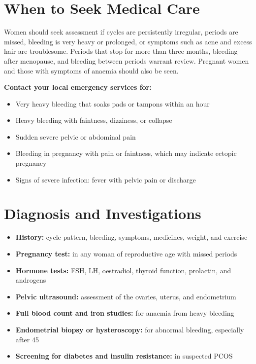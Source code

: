 \section*{When to Seek Medical Care}
Women should seek assessment if cycles are persistently irregular, periods are missed, bleeding is very heavy or prolonged, or symptoms such as acne and excess hair are troublesome. Periods that stop for more than three months, bleeding after menopause, and bleeding between periods warrant review. Pregnant women and those with symptoms of anaemia should also be seen.

\textbf{Contact your local emergency services for:}
\begin{itemize}
    \item Very heavy bleeding that soaks pads or tampons within an hour
    \item Heavy bleeding with faintness, dizziness, or collapse
    \item Sudden severe pelvic or abdominal pain
    \item Bleeding in pregnancy with pain or faintness, which may indicate ectopic pregnancy
    \item Signs of severe infection: fever with pelvic pain or discharge
\end{itemize}

\section*{Diagnosis and Investigations}
\begin{itemize}
    \item \textbf{History:} cycle pattern, bleeding, symptoms, medicines, weight, and exercise
    \item \textbf{Pregnancy test:} in any woman of reproductive age with missed periods
    \item \textbf{Hormone tests:} FSH, LH, oestradiol, thyroid function, prolactin, and androgens
    \item \textbf{Pelvic ultrasound:} assessment of the ovaries, uterus, and endometrium
    \item \textbf{Full blood count and iron studies:} for anaemia from heavy bleeding
    \item \textbf{Endometrial biopsy or hysteroscopy:} for abnormal bleeding, especially after 45
    \item \textbf{Screening for diabetes and insulin resistance:} in suspected PCOS
\end{itemize}

